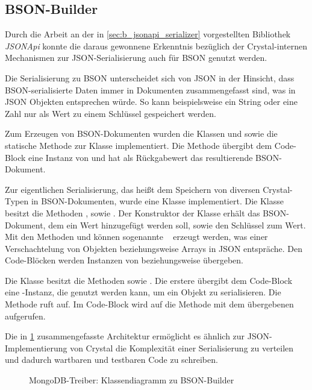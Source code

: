 \subsection{BSON-Builder}
\label{ssec:bm_bson_builder}

Durch die Arbeit an der in \cref{sec:b_jsonapi_serializer} vorgestellten
Bibliothek \emph{JSONApi} konnte die daraus gewonnene Erkenntnis bezüglich der
Crystal-internen Mechanismen zur JSON-Serialisierung auch für BSON genutzt
werden.

Die Serialisierung zu BSON unterscheidet sich von JSON in der Hinsicht, dass
BSON-serialisierte Daten immer in Dokumenten zusammengefasst sind, was in JSON
Objekten entsprechen würde.  So kann beispielsweise ein String oder eine Zahl
nur als Wert zu einem Schlüssel gespeichert werden.

Zum Erzeugen von BSON-Dokumenten wurden die Klassen  und
 sowie die statische Methode  zur
Klasse  implementiert.  Die Methode übergibt dem Code-Block eine
Instanz von  und hat als Rückgabewert das resultierende
BSON-Dokument.

Zur eigentlichen Serialisierung, das heißt dem Speichern von diversen
Crystal-Typen in BSON-Dokumenten, wurde eine Klasse 
implementiert.  Die Klasse besitzt die Methoden ,
 sowie .  Der Konstruktor der
Klasse erhält das BSON-Dokument, dem ein Wert hinzugefügt werden soll, sowie
den Schlüssel zum Wert.  Mit den Methoden  und
 können sogenannte ~\cite{mongo-embedded-docs} erzeugt werden, was einer Verschachtelung
von Objekten beziehungsweise Arrays in JSON entspräche.  Den Code-Blöcken werden
Instanzen von  beziehungsweise 
übergeben.

Die Klasse  besitzt die Methoden 
sowie .  Die erstere übergibt dem Code-Block eine
-Instanz, die genutzt werden kann, um ein Objekt zu
serialisieren.  Die Methode  ruft
 auf.  Im Code-Block wird auf  die Methode
 mit dem übergebenen  aufgerufen.

Die in \cref{fig:mongocr_builder_klassendiagramm} zusammengefasste Architektur
ermöglicht es ähnlich zur JSON-Implementierung von Crystal die Komplexität
einer Serialisierung zu verteilen und dadurch wartbaren und testbaren Code zu
schreiben.

\begin{figure}
	\centering
	
	\caption{MongoDB-Treiber: Klassendiagramm zu BSON-Builder}
	\label{fig:mongocr_builder_klassendiagramm}
\end{figure}
